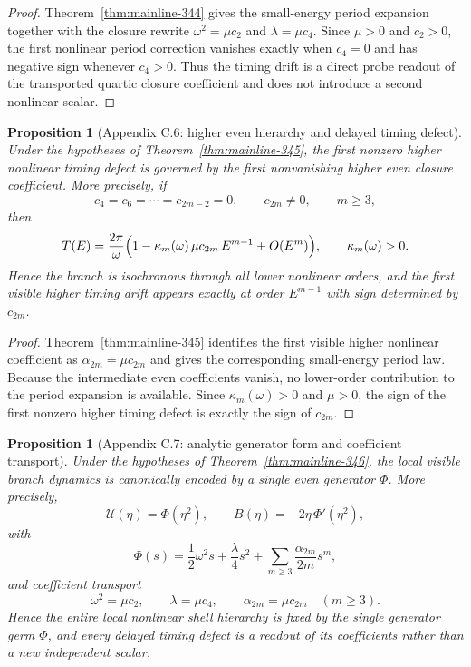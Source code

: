 \documentclass[12pt,a4paper]{article}
\newtheorem{proposition}[theorem]{Proposition}
\begin{document}
\begin{proof}
Theorem~\ref{thm:mainline-344} gives the small-energy period expansion together with the closure rewrite $\omega^2=\mu c_2$ and $\lambda=\mu c_4$. Since $\mu>0$ and $c_2>0$, the first nonlinear period correction vanishes exactly when $c_4=0$ and has negative sign whenever $c_4>0$. Thus the timing drift is a direct probe readout of the transported quartic closure coefficient and does not introduce a second nonlinear scalar.
\end{proof}


\begin{proposition}[Appendix C.6: higher even hierarchy and delayed timing defect]
\label{prop:app-c-34-6}
Under the hypotheses of Theorem~\ref{thm:mainline-345}, the first nonzero higher nonlinear timing defect is governed by the first nonvanishing higher even closure coefficient. More precisely, if
\[
 c_4=c_6=\cdots=c_{2m-2}=0,
 \qquad c_{2m}\neq 0,
 \qquad m\ge 3,
\]
then
\[
 T(E)=\frac{2\pi}{\omega}\Bigl(1-\kappa_m(\omega)\,\mu c_{2m}\,E^{m-1}+O(E^m)\Bigr),
 \qquad \kappa_m(\omega)>0.
\]
Hence the branch is isochronous through all lower nonlinear orders, and the first visible higher timing drift appears exactly at order $E^{m-1}$ with sign determined by $c_{2m}$.
\end{proposition}

\begin{proof}
Theorem~\ref{thm:mainline-345} identifies the first visible higher nonlinear coefficient as $\alpha_{2m}=\mu c_{2m}$ and gives the corresponding small-energy period law. Because the intermediate even coefficients vanish, no lower-order contribution to the period expansion is available. Since $\kappa_m(\omega)>0$ and $\mu>0$, the sign of the first nonzero higher timing defect is exactly the sign of $c_{2m}$.
\end{proof}


\begin{proposition}[Appendix C.7: analytic generator form and coefficient transport]
\label{prop:app-c-34-7}
Under the hypotheses of Theorem~\ref{thm:mainline-346}, the local visible branch dynamics is canonically encoded by a single even generator $\Phi$. More precisely,
\[
 \mathcal U(\eta)=\Phi(\eta^2),
 \qquad
 B(\eta)=-2\eta\,\Phi'(\eta^2),
\]
with
\[
 \Phi(s)=\frac12\omega^2 s + \frac{\lambda}{4}s^2 + \sum_{m\ge 3}\frac{\alpha_{2m}}{2m}s^m,
\]
and coefficient transport
\[
 \omega^2=\mu c_2,
 \qquad
 \lambda=\mu c_4,
 \qquad
 \alpha_{2m}=\mu c_{2m}\quad (m\ge 3).
\]
Hence the entire local nonlinear shell hierarchy is fixed by the single generator germ $\Phi$, and every delayed timing defect is a readout of its coefficients rather than a new independent scalar.
\end{proposition}
\end{document}

